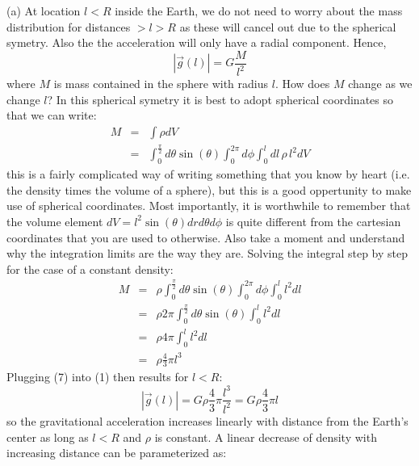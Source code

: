     \begin{tcolorbox}[enhanced jigsaw,breakable,pad at break*=1mm,
    colback=blue!5!white,colframe=babyblueeyes,title=Solutions,
    watermark color=white]
 
      (a) At location $l<R$ inside the Earth, we do not need to worry about the mass distribution for distances $>l>R$ as these will cancel out due to the spherical symetry. Also the the acceleration will only have a radial component. Hence,
    \begin{equation}
        |\vec{g}(l)| = G\frac{M}{l^2}
    \end{equation}
    where $M$ is mass contained in the sphere with radius $l$. How does $M$ change as we change $l$? In this spherical symetry it is best to adopt spherical coordinates so that we can write: 
    \begin{eqnarray}
    M &=& \int \rho dV \\ 
    &=& \int_0^{\frac{\pi}{2}} d\theta \sin(\theta) \int_0^{2\pi}  d\phi \int_0^l dl\,\rho\,l^2 dV
    \end{eqnarray}
    this is a fairly complicated way of writing something that you know by heart (i.e. the density times the volume of a sphere), but this is a good oppertunity to make use of spherical coordinates. Most importantly, it is worthwhile to remember that the volume element $dV = l^2 \sin(\theta)drd\theta d\phi$ is quite different from the cartesian coordinates that you are used to otherwise. Also take a moment and understand why the integration limits are the way they are. Solving the integral step by step for the case of a constant density:
    \begin{eqnarray}
        M &=& \rho \int_0^{\frac{\pi}{2}} d\theta \sin(\theta)\int_0^{2\pi}  d\phi \int_0^l l^2 dl \\
         &=&\rho 2\pi \int_0^{\frac{\pi}{2}} d\theta \sin(\theta)\int_0^l l^2dl\\
         &=&\rho 4\pi \int_0^l l^2dl \\ 
         &=&\rho \frac{4}{3}\pi l^3
    \end{eqnarray}
    Plugging (7) into (1) then results for $l<R$:
    \begin{equation}
        |\vec{g}(l)| = G  \rho \frac{4}{3}\pi \frac{l^3}{l^2} = G  \rho \frac{4}{3}\pi l
    \end{equation}
    so the gravitational acceleration increases linearly with distance from the Earth's center as long as $l<R$ and $\rho$ is constant. A linear decrease of density with increasing distance can be parameterized as:

\end{tcolorbox}
